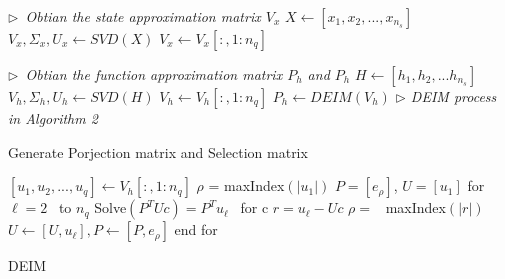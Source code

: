 \begin{algorithm}
\emph{$\triangleright$\ Obtian the state approximation matrix \(V_x\)}\;
$ X \leftarrow [x_1,x_2,...,x_{n_s}]$	\;
$ V_x,\Sigma_x,U_x \leftarrow SVD(X)$	\;
$ V_x \leftarrow V_x[:,1:n_q]$	\;

\emph{$\triangleright$\ Obtian the function approximation matrix \(P_h\) and \(P_h\)}\;
$ H \leftarrow [h_1,h_2,...h_{n_s}] $	\;
$ V_h,\Sigma_h,U_h \leftarrow SVD(H)$	\;
$ V_h \leftarrow V_h[:,1:n_q]$	\;
$ P_h  \leftarrow DEIM(V_h)$	\qquad \emph{$\triangleright$ DEIM process in Algorithm 2}\;

 \caption{Generate Porjection matrix and Selection matrix}
 \label{alg:GenPUV}
\end{algorithm}
\begin{algorithm}
$[u_1,u_2,...,u_q] \leftarrow V_h[:,1:n_q]$	\;
$\rho$ = maxIndex$(|u_1|)$							\;
$P = [e_{\rho}]$, \quad $U = [u_1]$			\;
for $\ell = 2$ \ to \(n_q\) 							\;
\qquad	Solve$(P^T U c) = P^T u_{\ell}$ \ for c	\;
\qquad	$r = u_{\ell} -Uc$						\;
\qquad	$\rho =$ \ maxIndex$(|r|)$						\;
\qquad	$U \leftarrow [U,u_{\ell}], P \leftarrow [P,e_{\rho}]$		\;
end for	
 \caption{DEIM}
 \label{alg:deim}
\end{algorithm}


